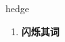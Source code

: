 
\begin{frame}
{\huge hedge}
\begin{center}
\begin{enumerate}\Large
  \item \textbf{闪烁其词}
\end{enumerate}
\end{center}
\end{frame}
